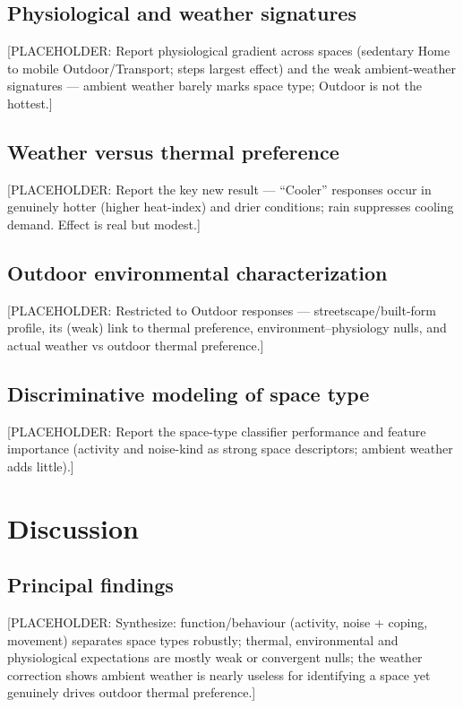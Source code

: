 \documentclass[]{interact}
\begin{document}
\subsection{Physiological and weather signatures}\label{sec:res-physio-weather}
[PLACEHOLDER: Report physiological gradient across spaces (sedentary Home to
mobile Outdoor/Transport; steps largest effect) and the weak ambient-weather
signatures --- ambient weather barely marks space type; Outdoor is not the
hottest.]

\subsection{Weather versus thermal preference}\label{sec:res-weather-tp}
[PLACEHOLDER: Report the key new result --- ``Cooler'' responses occur in
genuinely hotter (higher heat-index) and drier conditions; rain suppresses
cooling demand. Effect is real but modest.]


\subsection{Outdoor environmental characterization}\label{sec:res-outdoor}
[PLACEHOLDER: Restricted to Outdoor responses --- streetscape/built-form profile,
its (weak) link to thermal preference, environment--physiology nulls, and actual
weather vs outdoor thermal preference.]



\subsection{Discriminative modeling of space type}\label{sec:res-model}
[PLACEHOLDER: Report the space-type classifier performance and feature importance
(activity and noise-kind as strong space descriptors; ambient weather adds little).]


\section{Discussion}\label{sec:discussion}

\subsection{Principal findings}\label{sec:disc-findings}
[PLACEHOLDER: Synthesize: function/behaviour (activity, noise + coping, movement)
separates space types robustly; thermal, environmental and physiological
expectations are mostly weak or convergent nulls; the weather correction shows
ambient weather is nearly useless for identifying a space yet genuinely drives
outdoor thermal preference.]
\end{document}
